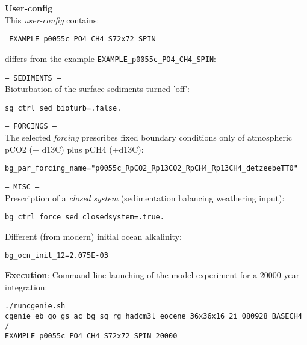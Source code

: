 \documentclass[10pt,twoside]{article}
\begin{document}
\noindent \textbf{User-config} 
\\ This \textit{user-config} contains:
\vspace{-10pt}\begin{verbatim} EXAMPLE_p0055c_PO4_CH4_S72x72_SPIN \end{verbatim}\vspace{-10pt}
differs from the example \texttt{EXAMPLE\_p0055c\_PO4\_CH4\_SPIN}:
\begin{compactitem}
		\item \texttt{--- SEDIMENTS ---}
		\\ Bioturbation of the surface sediments turned 'off':
\vspace{-5pt}\begin{verbatim}
sg_ctrl_sed_bioturb=.false.
		\end{verbatim}\vspace{-5pt}
		\item \texttt{--- FORCINGS ---}
	\\ The selected \textit{forcing} prescribes fixed boundary conditions only of atmospheric pCO2 (+ d13C) plus pCH4 (+d13C):
\vspace{-5pt}\begin{verbatim}
bg_par_forcing_name="p0055c_RpCO2_Rp13CO2_RpCH4_Rp13CH4_detzeebeTT0"
\end{verbatim}\vspace{-5pt}
		\item \texttt{--- MISC ---}
		\\ Prescription of a \textit{closed system} (sedimentation balancing weathering input):
\vspace{-5pt}\begin{verbatim}
bg_ctrl_force_sed_closedsystem=.true.
		\end{verbatim}\vspace{-5pt}
Different (from modern) initial ocean alkalinity:
\vspace{-5pt}\begin{verbatim}
bg_ocn_init_12=2.075E-03
		\end{verbatim}\vspace{-5pt}
	\end{compactitem}

\noindent \textbf{Execution}: Command-line launching of the model experiment for a 20000 year integration:
\vspace{-5pt}\begin{verbatim}./runcgenie.sh cgenie_eb_go_gs_ac_bg_sg_rg_hadcm3l_eocene_36x36x16_2i_080928_BASECH4 /
EXAMPLE_p0055c_PO4_CH4_S72x72_SPIN 20000\end{verbatim}
\end{document}
